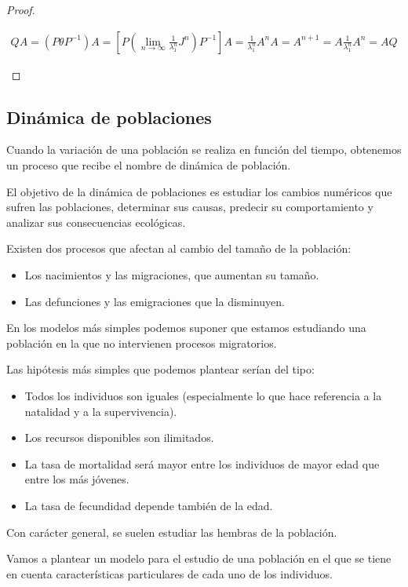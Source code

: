 \begin{proof}
\begin{itemize}
    \begin{align*}
        \label{}
        QA = (P\theta P^{-1})A = \left[ P \left( \lim_{n \to \infty} \frac{1}{\lambda^n_1}J^n \right) P^{-1} \right] A = \frac{1}{\lambda^n_1}A^nA=A^{n+1} = A \frac{1}{\lambda^n_1} A^n = AQ
    \end{align*}
    \end{itemize}
\end{proof}

    \subsection{Dinámica de poblaciones}
    \label{sub:din_mica_de_poblaciones}
    Cuando la variación de una población se realiza en función del tiempo, obtenemos un proceso que recibe el nombre de dinámica de población.

    El objetivo de la dinámica de poblaciones es estudiar los cambios numéricos que sufren las poblaciones, determinar sus causas, predecir su comportamiento y analizar sus consecuencias ecológicas.

    Existen dos procesos que afectan al cambio del tamaño de la población:
\begin{itemize}
	\item Los nacimientos y las migraciones, que aumentan su tamaño.
	\item Las defunciones y las emigraciones que la disminuyen.
\end{itemize}

En los modelos más simples podemos suponer que estamos estudiando una población en la que no intervienen procesos migratorios.

Las hipótesis más simples que podemos plantear serían del tipo:
\begin{itemize}
	\item Todos los individuos son iguales (especialmente lo que hace referencia a la natalidad y a la supervivencia).
	\item Los recursos disponibles son ilimitados.
	\item La tasa de mortalidad será mayor entre los individuos de mayor edad que entre los más jóvenes.
	\item La tasa de fecundidad depende también de la edad.
\end{itemize}

Con carácter general, se suelen estudiar las hembras de la población.

Vamos a plantear un modelo para el estudio de una población en el que se tiene en cuenta características particulares de cada uno de los individuos.

